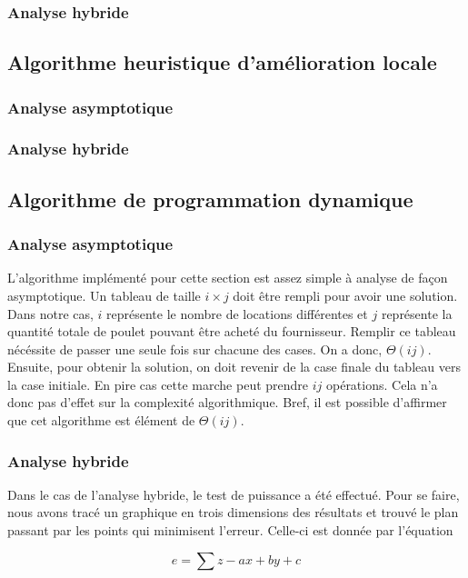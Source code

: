\documentclass[a4paper, 12pt]{article} %
\begin{document}
\subsubsection*{Analyse hybride}

\subsection*{Algorithme heuristique d'amélioration locale}
\subsubsection*{Analyse asymptotique}

\subsubsection*{Analyse hybride}
\subsection*{Algorithme de programmation dynamique}
\subsubsection*{Analyse asymptotique}
    L'algorithme implémenté pour cette section est assez simple à analyse de façon
    asymptotique. Un tableau de taille $i\times j$ doit être rempli pour avoir une solution.
    Dans notre cas, $i$ représente le nombre de locations différentes et $j$ représente la quantité
    totale de poulet pouvant être acheté du fournisseur. Remplir ce tableau nécéssite de passer une seule
    fois sur chacune des cases. On a donc, $\Theta(ij)$. Ensuite, pour obtenir la solution, on doit 
    revenir de la case finale du tableau vers la case initiale. En pire cas cette marche peut prendre
    $ij$ opérations. Cela n'a donc pas d'effet sur la complexité algorithmique. Bref, il est possible 
    d'affirmer que cet algorithme est élément de $\Theta(ij)$.
\subsubsection*{Analyse hybride}
    Dans le cas de l'analyse hybride, le test de puissance a été effectué. Pour se faire,
    nous avons tracé un graphique en trois dimensions des résultats et trouvé le plan
    passant par les points qui minimisent l'erreur. Celle-ci est donnée par l'équation

    \begin{equation}
        e = \sum z - ax + by + c
    \end{equation}
    
\end{document}
